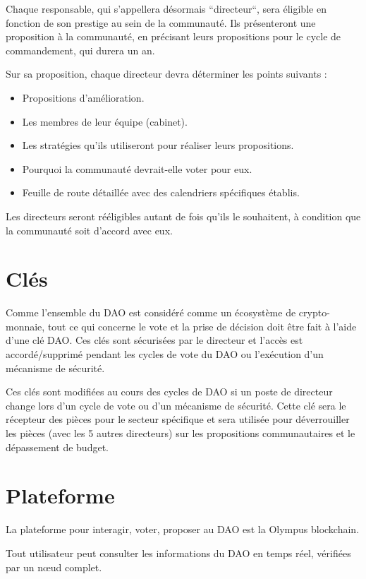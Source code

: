 \documentclass{article}
\begin{document}
Chaque responsable, qui s'appellera désormais ``directeur``, sera éligible en fonction de son prestige au sein de la communauté. Ils présenteront une proposition à la communauté, en précisant leurs propositions pour le cycle de commandement, qui durera un an.

Sur sa proposition, chaque directeur devra déterminer les points suivants :

\begin{itemize}
  \item Propositions d'amélioration.
  \item Les membres de leur équipe (cabinet).
  \item Les stratégies qu'ils utiliseront pour réaliser leurs propositions.
  \item Pourquoi la communauté devrait-elle voter pour eux.
  \item Feuille de route détaillée avec des calendriers spécifiques établis.
\end{itemize}

Les directeurs seront rééligibles autant de fois qu'ils le souhaitent, à condition que la communauté soit d'accord avec eux.

\section{Clés}

Comme l'ensemble du DAO est considéré comme un écosystème de crypto-monnaie, tout ce qui concerne le vote et la prise de décision doit être fait à l'aide d'une clé DAO. Ces clés sont sécurisées par le directeur et l'accès est accordé/supprimé pendant les cycles de vote du DAO ou l'exécution d'un mécanisme de sécurité.

Ces clés sont modifiées au cours des cycles de DAO si un poste de directeur change lors d'un cycle de vote ou d'un mécanisme de sécurité. Cette clé sera le récepteur des pièces pour le secteur spécifique et sera utilisée pour déverrouiller les pièces (avec les 5 autres directeurs) sur les propositions communautaires et le dépassement de budget.

\section{Plateforme}

La plateforme pour interagir, voter, proposer au DAO est la Olympus blockchain.

Tout utilisateur peut consulter les informations du DAO en temps réel, vérifiées par un nœud complet. 
\end{document}
